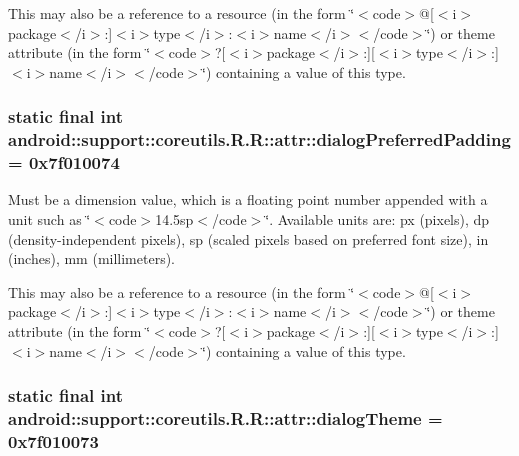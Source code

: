 This may also be a reference to a resource (in the form \char`\"{}$<$code$>$@\mbox{[}$<$i$>$package$<$/i$>$:\mbox{]}$<$i$>$type$<$/i$>$:$<$i$>$name$<$/i$>$$<$/code$>$\char`\"{}) or theme attribute (in the form \char`\"{}$<$code$>$?\mbox{[}$<$i$>$package$<$/i$>$:\mbox{]}\mbox{[}$<$i$>$type$<$/i$>$:\mbox{]}$<$i$>$name$<$/i$>$$<$/code$>$\char`\"{}) containing a value of this type. \hypertarget{classandroid_1_1support_1_1coreutils_1_1_r_1_1attr_002eddd3a0b595e5f2fe5ddbd7226551}{
\subsubsection[{dialogPreferredPadding}]{\setlength{\rightskip}{0pt plus 5cm}static final int android::support::coreutils.R.R::attr::dialogPreferredPadding = 0x7f010074}}
\label{classandroid_1_1support_1_1coreutils_1_1_r_1_1attr_002eddd3a0b595e5f2fe5ddbd7226551}


Must be a dimension value, which is a floating point number appended with a unit such as \char`\"{}$<$code$>$14.5sp$<$/code$>$\char`\"{}. Available units are: px (pixels), dp (density-independent pixels), sp (scaled pixels based on preferred font size), in (inches), mm (millimeters). 

This may also be a reference to a resource (in the form \char`\"{}$<$code$>$@\mbox{[}$<$i$>$package$<$/i$>$:\mbox{]}$<$i$>$type$<$/i$>$:$<$i$>$name$<$/i$>$$<$/code$>$\char`\"{}) or theme attribute (in the form \char`\"{}$<$code$>$?\mbox{[}$<$i$>$package$<$/i$>$:\mbox{]}\mbox{[}$<$i$>$type$<$/i$>$:\mbox{]}$<$i$>$name$<$/i$>$$<$/code$>$\char`\"{}) containing a value of this type. \hypertarget{classandroid_1_1support_1_1coreutils_1_1_r_1_1attr_5638418ce59f939205c7a8f193641058}{
\subsubsection[{dialogTheme}]{\setlength{\rightskip}{0pt plus 5cm}static final int android::support::coreutils.R.R::attr::dialogTheme = 0x7f010073}}
\label{classandroid_1_1support_1_1coreutils_1_1_r_1_1attr_5638418ce59f939205c7a8f193641058}


